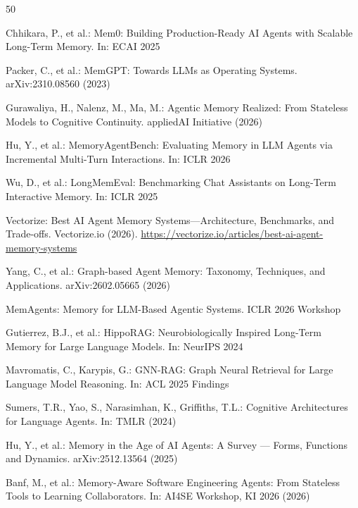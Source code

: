 \documentclass[hf]{ceurart}
\begin{document}
\begin{thebibliography}{50}

Chhikara, P., et al.: Mem0: Building Production-Ready AI Agents with
Scalable Long-Term Memory. In: ECAI 2025

Packer, C., et al.: MemGPT: Towards LLMs as Operating Systems.
arXiv:2310.08560 (2023)

Gurawaliya, H., Nalenz, M., Ma, M.: Agentic Memory Realized: From
Stateless Models to Cognitive Continuity. appliedAI Initiative (2026)

Hu, Y., et al.: MemoryAgentBench: Evaluating Memory in LLM Agents via
Incremental Multi-Turn Interactions. In: ICLR 2026

Wu, D., et al.: LongMemEval: Benchmarking Chat Assistants on
Long-Term Interactive Memory. In: ICLR 2025

Vectorize: Best AI Agent Memory Systems---Architecture, Benchmarks,
and Trade-offs. Vectorize.io (2026).
\url{https://vectorize.io/articles/best-ai-agent-memory-systems}

Yang, C., et al.: Graph-based Agent Memory: Taxonomy, Techniques,
and Applications. arXiv:2602.05665 (2026)

MemAgents: Memory for LLM-Based Agentic Systems. ICLR 2026 Workshop

Gutierrez, B.J., et al.: HippoRAG: Neurobiologically Inspired
Long-Term Memory for Large Language Models. In: NeurIPS 2024

Mavromatis, C., Karypis, G.: GNN-RAG: Graph Neural Retrieval for
Large Language Model Reasoning. In: ACL 2025 Findings

Sumers, T.R., Yao, S., Narasimhan, K., Griffiths, T.L.: Cognitive
Architectures for Language Agents. In: TMLR (2024)

Hu, Y., et al.: Memory in the Age of AI Agents: A Survey --- Forms,
Functions and Dynamics. arXiv:2512.13564 (2025)

Banf, M., et al.: Memory-Aware Software Engineering Agents: From
Stateless Tools to Learning Collaborators. In: AI4SE Workshop,
KI 2026 (2026)


\end{thebibliography}
\end{document}
